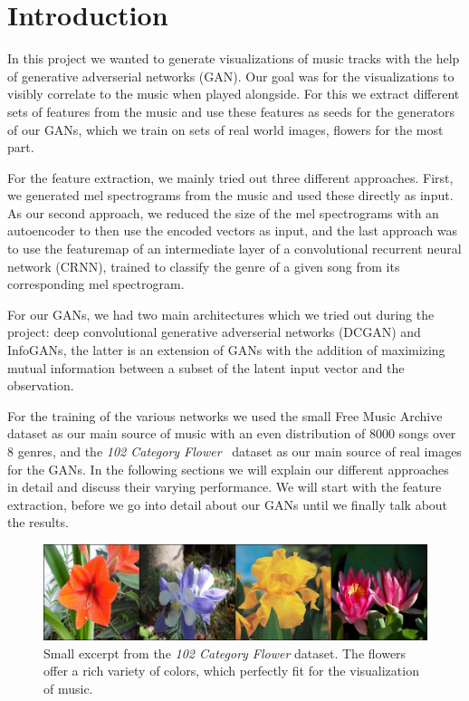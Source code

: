 \chapter{Introduction}
    In this project we wanted to generate visualizations of music tracks with the help of generative adverserial networks (GAN). Our goal was for the visualizations to visibly correlate to the music when played alongside.
    For this we extract different sets of features from the music and use these features as seeds for the generators of our GANs, which we train on sets of real world images, flowers for the most part.

    For the feature extraction, we mainly tried out three different approaches. First, we generated mel spectrograms from the music and used these directly as input. As our second approach, we reduced the size of the mel spectrograms with an autoencoder to then use the encoded vectors as input, and the last approach was to use the featuremap of an intermediate layer of a convolutional recurrent neural network (CRNN), trained to classify the genre of a given song from its corresponding mel spectrogram.

    For our GANs, we had two main architectures which we tried out during the project: deep convolutional generative adverserial networks (DCGAN) and InfoGANs, the latter is an extension of GANs with the addition of maximizing mutual information between a subset of the latent input vector and the observation.

    For the training of the various networks we used the small Free Music Archive~\cite{FMA} dataset as our main source of music with an even distribution of 8000 songs over 8 genres, and the \textit{102 Category Flower}~\cite{102flower} dataset as our main source of real images for the GANs. In the following sections we will explain our different approaches in detail and discuss their varying performance. We will start with the feature extraction, before we go into detail about our GANs until we finally talk about the results.

    \begin{figure}
        \centering
        \includegraphics[width=\textwidth]{images/real_samples}
        \caption{Small excerpt from the \textit{102 Category Flower} dataset. The flowers offer a rich variety of colors, which perfectly fit for the visualization of music.}
        \label{flowers}
    \end{figure}